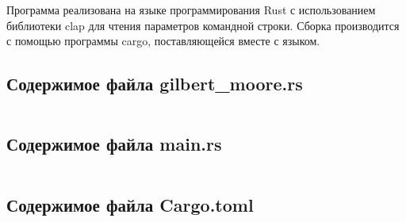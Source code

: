 \documentclass[a4paper,oneside]{article}
\theoremstyle{definition}
\begin{document}
Программа реализована на языке программирования Rust с использованием библиотеки
clap для чтения параметров командной строки. Сборка производится с помощью
программы cargo, поставляющейся вместе с языком.

\subsection{Содержимое файла gilbert\_moore.rs}
\inputminted{rust}{../../lab6/src/gilbert_moore.rs}

\subsection{Содержимое файла main.rs}
\inputminted{rust}{../../lab6/src/main.rs}

\subsection{Содержимое файла Cargo.toml}
\inputminted{toml}{../../lab6/Cargo.toml}
\end{document}
